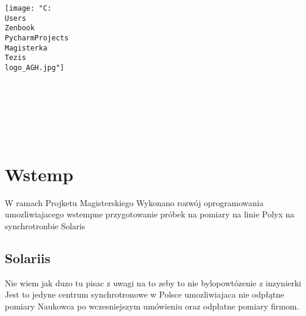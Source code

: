 \documentclass[11pt,a4paper]{article}
\begin{document}
    \thispagestyle{empty}
    \begin{center}
        \texttt{[image: "C:\\Users\\Zenbook\\PycharmProjects\\Magisterka\\Tezis\\logo\_AGH.jpg"]}\\
        \bf{}\\[5mm]
        \bf{}\\[14mm]

        \\[12mm]

        \\[40mm]
    \end{center}
    \\[10mm]
    \begin{center}
    \end{center}


    \newpage

    \tableofcontents

    \newpage


    \section{Wstemp}
    \hspace{1cm} W ramach Projketu Magisterskiego Wykonano rozwój oprogramowania umozliwiajacego wstempne przygotowanie próbek na pomiary na linie Polyx na synchrotronbie Solaris\\

    \subsection{Solariis}
    Nie wiem jak duzo tu pisac z uwagi na to zeby to nie bylopowtózenie z inzynierki
    \hspace{1cm} Jest to jedyne centrum synchrotronowe w Polsce umozliwiajaca nie odpłątne pomiary Naukowca po wczesniejszym umówieniu oraz odpłatne pomiary firmom.\\
\end{document}
